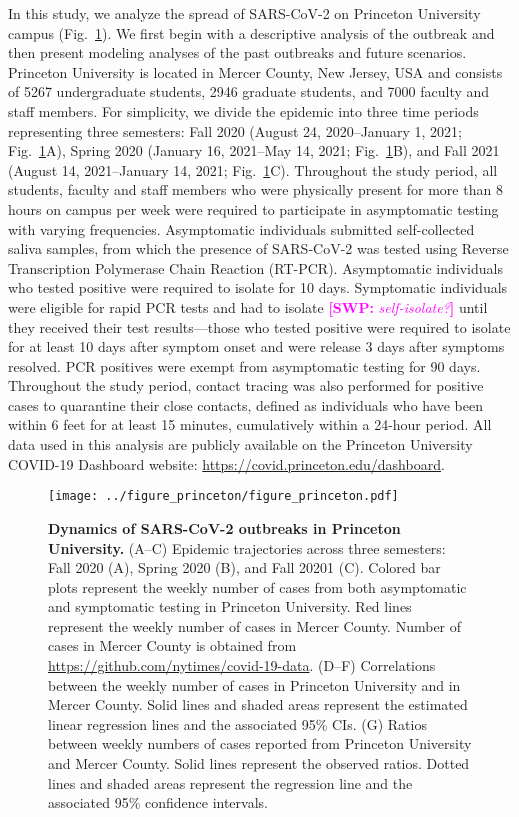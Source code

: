 \documentclass[12pt]{article}
\newcommand{\fref}[1]{Fig.~\ref{fig:#1}}
\newcommand{\comment}[3]{\textcolor{#1}{\textbf{[#2: }\textsl{#3}\textbf{]}}}
\newcommand{\swp}[1]{\comment{magenta}{SWP}{#1}}
\begin{document}
In this study, we analyze the spread of SARS-CoV-2 on Princeton University campus (\fref{princeton}).
We first begin with a descriptive analysis of the outbreak and then present modeling analyses of the past outbreaks and future scenarios.
Princeton University is located in Mercer County, New Jersey, USA and consists of 5267 undergraduate students, 2946 graduate students, and 7000 faculty and staff members.
For simplicity, we divide the epidemic into three time periods representing three semesters: Fall 2020 (August 24, 2020--January 1, 2021; \fref{princeton}A), Spring 2020 (January 16, 2021--May 14, 2021; \fref{princeton}B), and Fall 2021 (August 14, 2021--January 14, 2021; \fref{princeton}C).
Throughout the study period, all students, faculty and staff members who were physically present for more than 8 hours on campus per week were required to participate in asymptomatic testing with varying frequencies.
Asymptomatic individuals submitted self-collected saliva samples, from which the presence of SARS-CoV-2 was tested using Reverse Transcription Polymerase Chain Reaction (RT-PCR).  
Asymptomatic individuals who tested positive were required to isolate for 10 days.
Symptomatic individuals were eligible for rapid PCR tests and had to isolate \swp{self-isolate?} until they received their test results---those who tested positive were required to isolate for at least 10 days after symptom onset and were release 3 days after symptoms resolved.
PCR positives were exempt from asymptomatic testing for 90 days.
Throughout the study period, contact tracing was also performed for positive cases to quarantine their close contacts, defined as individuals who have been within 6 feet for at least 15 minutes, cumulatively within a 24-hour period.
All data used in this analysis are publicly available on the Princeton University COVID-19 Dashboard website: \url{https://covid.princeton.edu/dashboard}.


\begin{figure}[!th]
\texttt{[image: ../figure\_princeton/figure\_princeton.pdf]}
\caption{
\textbf{Dynamics of SARS-CoV-2 outbreaks in Princeton University.}
(A--C) Epidemic trajectories across three semesters: Fall 2020 (A), Spring 2020 (B), and Fall 20201 (C).
Colored bar plots represent the weekly number of cases from both asymptomatic and symptomatic testing in Princeton University.
Red lines represent the weekly number of cases in Mercer County.
Number of cases in Mercer County is obtained from \url{https://github.com/nytimes/covid-19-data}.
(D--F) Correlations between the weekly number of cases in Princeton University and in Mercer County.
Solid lines and shaded areas represent the estimated linear regression lines and the associated 95\% CIs.
(G) Ratios between weekly numbers of cases reported from Princeton University and Mercer County.
Solid lines represent the observed ratios.
Dotted lines and shaded areas represent the regression line and the associated 95\% confidence intervals.
\label{fig:princeton}
}
\end{figure}
\end{document}
